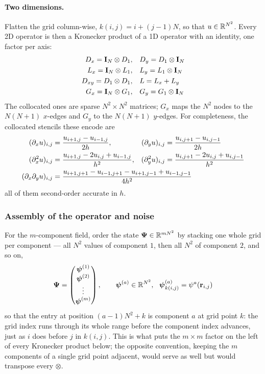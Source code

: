 \documentclass[a5paper]{article}
\begin{document}
\paragraph{Two dimensions.} Flatten the grid column-wise, $k(i,j) = i + (j-1)N$, so that $u\in\mathbb{R}^{N^2}$. Every 2D operator is then a Kronecker product of a 1D operator with an identity, one factor per axis:
\begin{align}
    \label{kron-derivatives}
    D_x = \boldsymbol{\mathrm{I}}_N \otimes D_1, & \quad D_y = D_1 \otimes \boldsymbol{\mathrm{I}}_N
    \\
    L_x = \boldsymbol{\mathrm{I}}_N \otimes L_1, & \quad L_y = L_1 \otimes \boldsymbol{\mathrm{I}}_N
    \\
    D_{xy} = D_1 \otimes D_1, & \quad L = L_x + L_y
    \\
    \label{kron-G}
    G_x = \boldsymbol{\mathrm{I}}_N \otimes G_1, & \quad G_y = G_1 \otimes \boldsymbol{\mathrm{I}}_N
\end{align}
The collocated ones are sparse $N^2\times N^2$ matrices; $G_x$ maps the $N^2$ nodes to the $N(N{+}1)$ $x$-edges and $G_y$ to the $N(N{+}1)$ $y$-edges. For completeness, the collocated stencils these encode are
\begin{align}
    (\partial_x u)_{i,j} &= \frac{u_{i+1,j} - u_{i-1,j}}{2h},
    &
    (\partial_y u)_{i,j} &= \frac{u_{i,j+1} - u_{i,j-1}}{2h}
    \\
    (\partial_x^2 u)_{i,j} &= \frac{u_{i+1,j} - 2u_{i,j} + u_{i-1,j}}{h^2},
    &
    (\partial_y^2 u)_{i,j} &= \frac{u_{i,j+1} - 2u_{i,j} + u_{i,j-1}}{h^2}
    \\
    (\partial_x \partial_y u)_{i,j} &= \frac{u_{i+1,j+1} - u_{i-1,j+1} - u_{i+1,j-1} + u_{i-1,j-1}}{4h^2}\hspace{-3cm}
\end{align}
all of them second-order accurate in $h$.

\subsubsection{Assembly of the operator and noise}
For the $m$-component field, order the state $\boldsymbol\Psi\in\mathbb{R}^{mN^2}$ by stacking one whole grid per component --- all $N^2$ values of component $1$, then all $N^2$ of component $2$, and so on,
\begin{align}
    \label{state-ordering}
    \boldsymbol\Psi = \begin{pmatrix} \boldsymbol\psi^{(1)} \\ \boldsymbol\psi^{(2)} \\ \vdots \\ \boldsymbol\psi^{(m)} \end{pmatrix},
    \qquad
    \boldsymbol\psi^{(a)}\in\mathbb{R}^{N^2},\ \ \boldsymbol\psi^{(a)}_{k(i,j)} = \psi^a(\mathbf{r}_{i,j})
\end{align}
so that the entry at position $(a-1)N^2+k$ is component $a$ at grid point $k$: the grid index runs through its whole range before the component index advances, just as $i$ does before $j$ in $k(i,j)$. This is what puts the $m\times m$ factor on the left of every Kronecker product below; the opposite convention, keeping the $m$ components of a single grid point adjacent, would serve as well but would transpose every $\otimes$.
\end{document}
